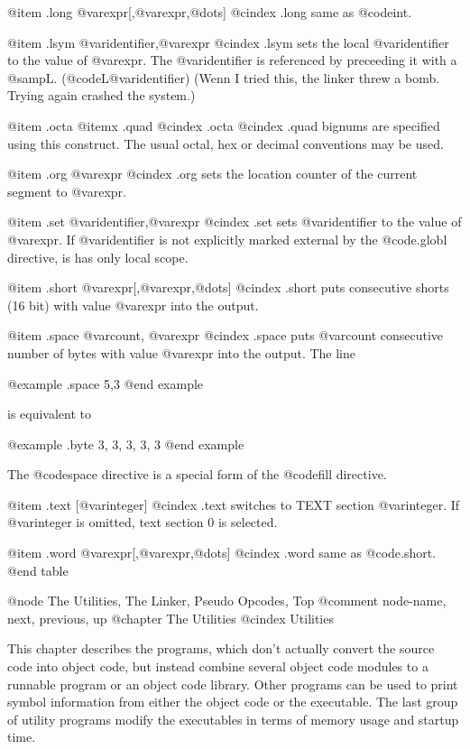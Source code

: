 {{{{{@item .long @var{expr}[,@var{expr},@dots{}]
@cindex .long
same as @code{int}.

@item .lsym @var{identifier},@var{expr}
@cindex .lsym
sets the local @var{identifier} to the value of @var{expr}. The 
@var{identifier} is referenced by preceeding it with a @samp{L}.
(@code{L@var{identifier}}) (Wenn I tried this, the linker threw a
bomb. Trying again crashed the system.)

@item .octa
@itemx .quad
@cindex .octa
@cindex .quad
bignums are specified using this construct. The usual octal, hex or
decimal conventions may be used.

@item .org @var{expr}
@cindex .org
sets the location counter of the current segment to @var{expr}.

@item .set @var{identifier},@var{expr}
@cindex .set 
sets @var{identifier} to the value of @var{expr}. If @var{identifier} is
not explicitly marked external by the @code{.globl} directive, is has only
local scope.

@item .short @var{expr}[,@var{expr},@dots{}]
@cindex .short
puts consecutive shorts (16 bit) with value @var{expr} into the output.

@item .space @var{count}, @var{expr}
@cindex .space
puts @var{count} consecutive number of bytes with value @var{expr} into
the output. The line

@example
.space 5,3
@end example

is equivalent to

@example
.byte 3, 3, 3, 3, 3
@end example

The @code{space} directive is a special form of the @code{fill} directive.

@item .text [@var{integer}]
@cindex .text
switches to TEXT section @var{integer}. If @var{integer} is omitted,
text section 0 is selected.
  
@item .word @var{expr}[,@var{expr},@dots{}]
@cindex .word
same as @code{.short}.
@end table

@node     The Utilities, The Linker, Pseudo Opcodes, Top
@comment  node-name,     next,       previous,       up
@chapter The Utilities
@cindex Utilities

This chapter describes the programs, which don't actually convert
the source code into object code, but instead combine several object
code modules to a runnable program or an object code library. Other
programs can be used to print symbol information from either the
object code or the executable. The last group of utility programs
modify the executables in terms of memory usage and startup time.

}}}}}
